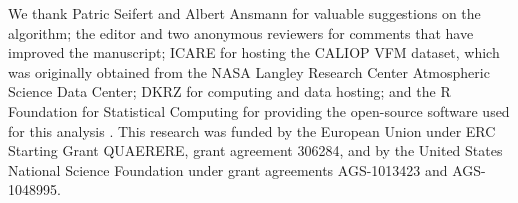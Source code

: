\documentclass[essd,manuscript]{copernicus}\usepackage[]{graphicx}\usepackage[]{color}
\begin{document}
\begin{acknowledgements}
  We thank Patric Seifert and Albert Ansmann for valuable suggestions on the
  algorithm; the editor and two anonymous reviewers for comments that have
  improved the manuscript; ICARE for hosting the CALIOP VFM dataset, which was
  originally obtained from the NASA Langley Research Center Atmospheric Science
  Data Center; DKRZ for computing and data hosting; and the R Foundation for
  Statistical Computing for providing the open-source software used for this
  analysis \citep{R}.  This research was funded by the European Union under ERC Starting
  Grant QUAERERE, grant agreement 306284, and by the United States National
  Science Foundation under grant agreements AGS-1013423 and AGS-1048995.
\end{acknowledgements}




\clearpage
\end{document}
